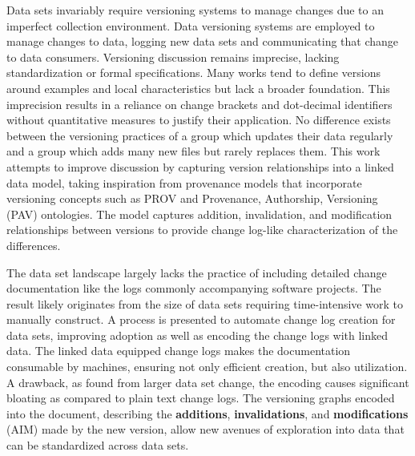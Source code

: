 

Data sets invariably require versioning systems to manage changes due to an imperfect collection environment.
Data versioning systems are employed to manage changes to data, logging new data sets and communicating that change to data consumers.
Versioning discussion remains imprecise, lacking standardization or formal specifications.
Many works tend to define versions around examples and local characteristics but lack a broader foundation.
This imprecision results in a reliance on change brackets and dot-decimal identifiers without quantitative measures to justify their application.
No difference exists between the versioning practices of a group which updates their data regularly and a group which adds many new files but rarely replaces them.
This work attempts to improve discussion by capturing version relationships into a linked data model, taking inspiration from provenance models that incorporate versioning concepts such as PROV and Provenance, Authorship, Versioning (PAV) ontologies.
The model captures addition, invalidation, and modification relationships between versions to provide change log-like characterization of the differences.

The data set landscape largely lacks the practice of including detailed change documentation like the logs commonly accompanying software projects.
The result likely originates from the size of data sets requiring time-intensive work to manually construct.
A process is presented to automate change log creation for data sets, improving adoption as well as encoding the change logs with linked data.
The linked data equipped change logs makes the documentation consumable by machines, ensuring not only efficient creation, but also utilization.
A drawback, as found from larger data set change, the encoding causes significant bloating as compared to plain text change logs.
The versioning graphs encoded into the document, describing the \textbf{additions}, \textbf{invalidations}, and \textbf{modifications} (AIM) made by the new version, allow new avenues of exploration into data that can be standardized across data sets.

